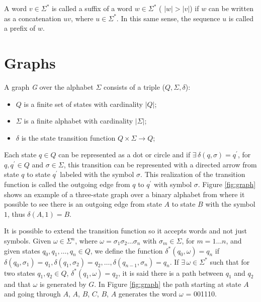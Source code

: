 {A word $v \in \Sigma^*$ is called a suffix of a word $w \in \Sigma^*$ ( $|\textit{w}| > |\textit{v}|$) if $w$ can be written as a concatenation $uv$, where $u \in \Sigma^*$. In this same sense, the sequence $u$ is called a prefix of $w$. 

\section{Graphs}

\begin{definition}\label{def:graph}
A graph \textit{G} over the alphabet $\Sigma$ consists of a triple ($Q, \Sigma,\delta$):
\begin{itemize}
	\item $Q$ is a finite set of states with cardinality $|Q|$;
    \item $\Sigma$ is a finite alphabet with cardinality $|\Sigma|$;
    \item $\delta$ is the state transition function $Q\times\Sigma \rightarrow Q$;
\end{itemize}
\end{definition}

\noindent Each state $q \in Q$ can be represented as a dot or circle and if $\exists\, \delta(q, \sigma) = q^{\prime}$, for $q, q^{\prime} \in Q$ and $\sigma \in \Sigma$, this transition can be represented with a directed arrow from state $q$ to state $q^{\prime}$ labeled with the symbol $\sigma$. This realization of the transition function is called the outgoing edge from $q$ to $q^{\prime}$ with symbol $\sigma$. Figure \ref{fig:graph} shows an example of a three-state graph over a binary alphabet from where it possible to see there is an outgoing edge from state $A$ to state $B$ with the symbol $1$, thus $\delta(A, 1) = B$.

It is possible to extend the transition function so it accepts words and not just symbols. Given $\omega \in \Sigma^n$, where $\omega = \sigma_1\sigma_2\ldots\sigma_n$ with $\sigma_m \in \Sigma$, for $m = 1\ldots n$, and given states $q_0, q_1, \ldots, q_n \in Q$, we define the function $\delta^*(q_0, \omega) = q_n$ if $\delta(q_0, \sigma_1) = q_1, \delta(q_1,\sigma_2) = q_2, \ldots, \delta(q_{n-1},\sigma_n) = q_n$. If $\exists\, \omega \in \Sigma^*$ such that for two states $q_1, q_2 \in Q$, $\delta^*(q_1,\omega) = q_2$, it is said there is a path between $q_1$ and $q_2$ and that $\omega$ is generated by $G$. In Figure \ref{fig:graph} the path starting at state $A$ and going through $A$, $A$, $B$, $C$, $B$, $A$ generates the word $\omega	$ = 001110.

}
